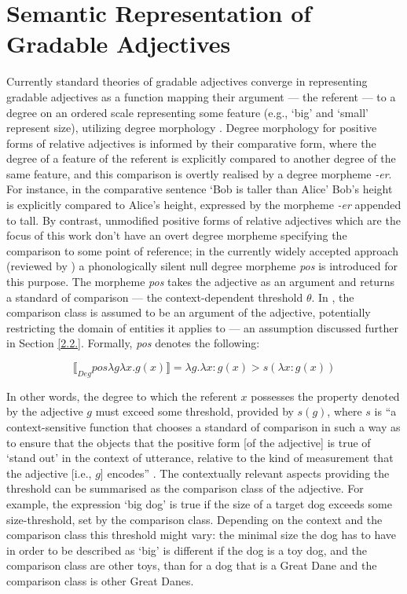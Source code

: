 \section{Semantic Representation of Gradable Adjectives}
\label{2.1.}
Currently standard theories of gradable adjectives converge in representing gradable adjectives as a function mapping their argument --- the referent --- to a degree on an ordered scale representing some feature (e.g., ‘big’ and ‘small’ represent size),  utilizing degree morphology \parencite{Kennedy2007}. Degree morphology for positive forms of relative adjectives is informed by their comparative form, where the degree of a feature of the referent is explicitly compared to another degree of the same feature, and this comparison is overtly realised by a degree morpheme \textit{-er}. For instance, in the comparative sentence ‘Bob is taller than Alice’ Bob’s height is explicitly compared to Alice’s height, expressed by the morpheme \textit{-er} appended to tall. 
By contrast, unmodified positive forms of relative adjectives which are the focus of this work don’t have an overt degree morpheme specifying the comparison to some point of reference; in the currently widely accepted approach (reviewed by \cite{Kennedy2007}) a phonologically silent null degree morpheme \textit{pos} is introduced for this purpose. 
The morpheme \textit{pos} takes the adjective as an argument and returns a standard of comparison --- the context-dependent threshold $\theta$. In \textcite{Kennedy2007}, the comparison class is assumed to be an argument of the adjective, potentially restricting the domain of entities it applies to --- an assumption discussed further in Section \ref{2.2.}. Formally, \textit{pos} denotes the following:

$$\llbracket_{Deg} pos \lambda g \lambda x. g(x)  \rrbracket = \lambda g. \lambda x: g(x) > s(\lambda x: g(x))$$

In other words, the degree to which the referent $x$ possesses the property denoted by the adjective $g$ must exceed some threshold, provided by $s(g)$, where $s$ is “a context-sensitive function that chooses a standard of comparison in such a way as to ensure that the objects that the positive form [of the adjective] is true of ‘stand out’ in the context of utterance, relative to the kind of measurement that the adjective [i.e., $g$] encodes” \parencite[p. 17]{Kennedy2007}. The contextually relevant aspects providing the threshold can be summarised as the comparison class of the adjective. 
For example, the expression ‘big dog’ is true if the size of a target dog exceeds some size-threshold, set by the comparison class. Depending on the context and the comparison class this threshold might vary: the minimal size the dog has to have in order to be described as ‘big’ is different if the dog is a toy dog, and the comparison class are other toys, than for a dog that is a Great Dane and the comparison class is other Great Danes.

